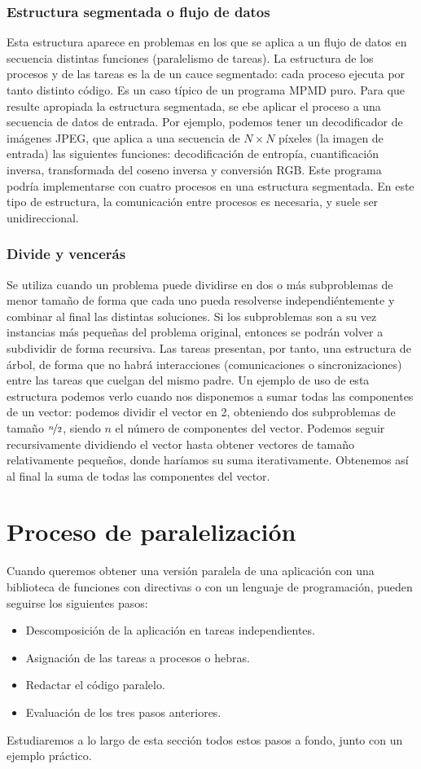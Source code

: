 \subsubsection{Estructura segmentada o flujo de datos} 
Esta estructura aparece en problemas en los que se aplica a un flujo de datos en secuencia distintas funciones (paralelismo de tareas). La estructura de los procesos y de las tareas es la de un cauce segmentado: cada proceso ejecuta por tanto distinto código. Es un caso típico de un programa MPMD puro. Para que resulte apropiada la estructura segmentada, se ebe aplicar el proceso a una secuencia de datos de entrada.
Por ejemplo, podemos tener un decodificador de imágenes JPEG, que aplica a una secuencia de $N\times N$ píxeles (la imagen de entrada) las siguientes funciones: decodificación de entropía, cuantificación inversa, transformada del coseno inversa y conversión RGB. Este programa podría implementarse con cuatro procesos en una estructura segmentada.
En este tipo de estructura, la comunicación entre procesos es necesaria, y suele ser unidireccional.

\subsubsection{Divide y vencerás} 
Se utiliza cuando un problema puede dividirse en dos o más subproblemas de menor tamaño de forma que cada uno pueda resolverse independiéntemente y combinar al final las distintas soluciones. Si los subproblemas son a su vez instancias más pequeñas del problema original, entonces se podrán volver a subdividir de forma recursiva. Las tareas presentan, por tanto, una estructura de árbol, de forma que no habrá interacciones (comunicaciones o sincronizaciones) entre las tareas que cuelgan del mismo padre.
Un ejemplo de uso de esta estructura podemos verlo cuando nos disponemos a sumar todas las componentes de un vector: podemos dividir el vector en 2, obteniendo dos subproblemas de tamaño $ \nicefrac{n}{2} $, siendo $n$ el número de componentes del vector. Podemos seguir recursivamente dividiendo el vector hasta obtener vectores de tamaño relativamente pequeños, donde haríamos su suma iterativamente. Obtenemos así al final la suma de todas las componentes del vector.

\newpage
\section{Proceso de paralelización}
Cuando queremos obtener una versión paralela de una aplicación con una biblioteca de funciones con directivas o con un lenguaje de programación, pueden seguirse los siguientes pasos:
\begin{itemize}
    \item Descomposición de la aplicación en tareas independientes.
    \item Asignación de las tareas a procesos o hebras. 
    \item Redactar el código paralelo. 
    \item Evaluación de los tres pasos anteriores.
\end{itemize}
Estudiaremos a lo largo de esta sección todos estos pasos a fondo, junto con un ejemplo práctico.

